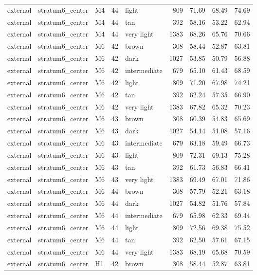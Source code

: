 \begin{tabular}{lllrlrrrr}
external & stratum6\_center & M4 & 44 & light & 809 & 71.69 & 68.49 & 74.69 \\
external & stratum6\_center & M4 & 44 & tan & 392 & 58.16 & 53.22 & 62.94 \\
external & stratum6\_center & M4 & 44 & very light & 1383 & 68.26 & 65.76 & 70.66 \\
external & stratum6\_center & M6 & 42 & brown & 308 & 58.44 & 52.87 & 63.81 \\
external & stratum6\_center & M6 & 42 & dark & 1027 & 53.85 & 50.79 & 56.88 \\
external & stratum6\_center & M6 & 42 & intermediate & 679 & 65.10 & 61.43 & 68.59 \\
external & stratum6\_center & M6 & 42 & light & 809 & 71.20 & 67.98 & 74.21 \\
external & stratum6\_center & M6 & 42 & tan & 392 & 62.24 & 57.35 & 66.90 \\
external & stratum6\_center & M6 & 42 & very light & 1383 & 67.82 & 65.32 & 70.23 \\
external & stratum6\_center & M6 & 43 & brown & 308 & 60.39 & 54.83 & 65.69 \\
external & stratum6\_center & M6 & 43 & dark & 1027 & 54.14 & 51.08 & 57.16 \\
external & stratum6\_center & M6 & 43 & intermediate & 679 & 63.18 & 59.49 & 66.73 \\
external & stratum6\_center & M6 & 43 & light & 809 & 72.31 & 69.13 & 75.28 \\
external & stratum6\_center & M6 & 43 & tan & 392 & 61.73 & 56.83 & 66.41 \\
external & stratum6\_center & M6 & 43 & very light & 1383 & 69.49 & 67.01 & 71.86 \\
external & stratum6\_center & M6 & 44 & brown & 308 & 57.79 & 52.21 & 63.18 \\
external & stratum6\_center & M6 & 44 & dark & 1027 & 54.82 & 51.76 & 57.84 \\
external & stratum6\_center & M6 & 44 & intermediate & 679 & 65.98 & 62.33 & 69.44 \\
external & stratum6\_center & M6 & 44 & light & 809 & 72.56 & 69.38 & 75.52 \\
external & stratum6\_center & M6 & 44 & tan & 392 & 62.50 & 57.61 & 67.15 \\
external & stratum6\_center & M6 & 44 & very light & 1383 & 68.19 & 65.68 & 70.59 \\
external & stratum6\_center & H1 & 42 & brown & 308 & 58.44 & 52.87 & 63.81 \\

\end{tabular}
